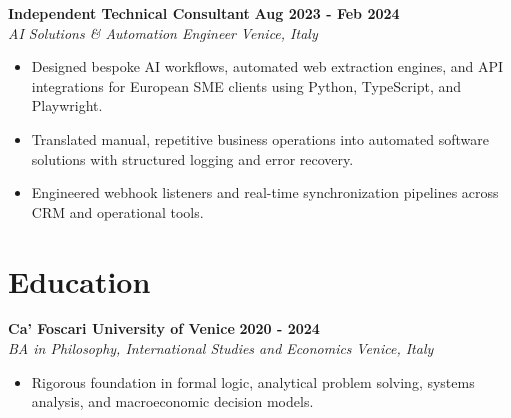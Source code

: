 \documentclass[10pt,a4paper]{article}
\newcommand{\role}[4]{%
  \textbf{#1} \hfill \textbf{#2}\\[1pt]%
  \textit{#3} \hfill \textit{#4}\\[2pt]%
}
\begin{document}
\role{Independent Technical Consultant}{Aug 2023 - Feb 2024}{AI Solutions \& Automation Engineer}{Venice, Italy}
\begin{itemize}
  \item Designed bespoke AI workflows, automated web extraction engines, and API integrations for European SME clients using Python, TypeScript, and Playwright.
  \item Translated manual, repetitive business operations into automated software solutions with structured logging and error recovery.
  \item Engineered webhook listeners and real-time synchronization pipelines across CRM and operational tools.
\end{itemize}

\section{Education}
\role{Ca' Foscari University of Venice}{2020 - 2024}{BA in Philosophy, International Studies and Economics}{Venice, Italy}
\begin{itemize}
  \item Rigorous foundation in formal logic, analytical problem solving, systems analysis, and macroeconomic decision models.
\end{itemize}
\end{document}
